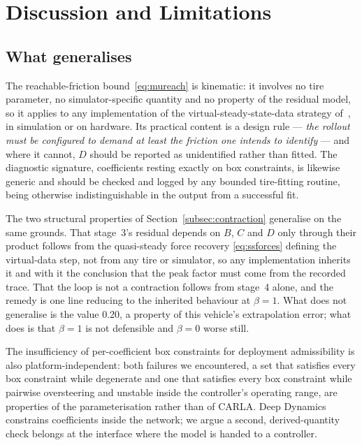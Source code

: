 \section{Discussion and Limitations}
\label{sec:disc}

\subsection{What generalises}

The reachable-friction bound~\eqref{eq:mureach} is kinematic: it involves no
tire parameter, no simulator-specific quantity and no property of the residual
model, so it applies to any implementation of the virtual-steady-state-data
strategy of~\cite{ontrack2025}, in simulation or on hardware. Its practical
content is a design rule --- \emph{the rollout must be configured to demand at
least the friction one intends to identify} --- and where it cannot, $D$ should
be reported as unidentified rather than fitted. The diagnostic signature,
coefficients resting exactly on box constraints, is likewise generic and should
be checked and logged by any bounded tire-fitting routine, being otherwise
indistinguishable in the output from a successful fit.

The two structural properties of Section~\ref{subsec:contraction} generalise on
the same grounds. That stage~3's residual depends on $B$, $C$ and $D$ only
through their product follows from the quasi-steady force recovery
\eqref{eq:ssforces} defining the virtual-data step, not from any tire or
simulator, so any implementation inherits it and with it the conclusion that
the peak factor must come from the recorded trace. That the loop is not a
contraction follows from stage~4 alone, and the remedy is one line reducing to
the inherited behaviour at $\beta=1$. What does not generalise is the value
\num{0.20}, a property of this vehicle's extrapolation error; what does is that
$\beta=1$ is not defensible and $\beta=0$ worse still.

The insufficiency of per-coefficient box constraints for deployment
admissibility is also platform-independent: both failures we encountered, a set
that satisfies every box constraint while degenerate and one that satisfies
every box constraint while pairwise oversteering and unstable inside the
controller's operating range, are properties of the parameterisation rather
than of CARLA. Deep Dynamics~\cite{deepdynamics2024} constrains coefficients
inside the network; we argue a second, derived-quantity check belongs at the
interface where the model is handed to a controller.

